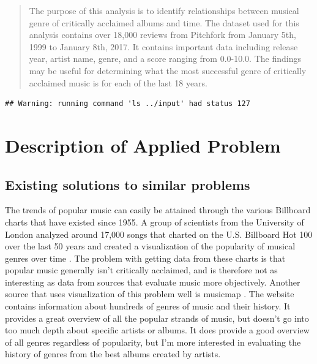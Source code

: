 \documentclass{article}
\begin{document}


\begin{abstract} 
{\bf } The purpose of this analysis is to identify relationships between
musical genre of critically acclaimed albums and time. The dataset used
for this analysis contains over 18,000 reviews from Pitchfork from
January 5th, 1999 to January 8th, 2017. It contains important data
including release year, artist name, genre, and a score ranging from
0.0-10.0. The findings may be useful for determining what the most
successful genre of critically acclaimed music is for each of the last
18 years. \end{abstract} 


\begin{verbatim}
## Warning: running command 'ls ../input' had status 127
\end{verbatim}

\section{Description of Applied
Problem}\label{description-of-applied-problem}

\subsection{Existing solutions to similar
problems}\label{existing-solutions-to-similar-problems}

The trends of popular music can easily be attained through the various
Billboard charts that have existed since 1955. A group of scientists
from the University of London analyzed around 17,000 songs that charted
on the U.S. Billboard Hot 100 over the last 50 years and created a
visualization of the popularity of musical genres over time
\citep{Billboard100}. The problem with getting data from these charts is
that popular music generally isn't critically acclaimed, and is
therefore not as interesting as data from sources that evaluate music
more objectively. Another source that uses visualization of this problem
well is musicmap \citep{musicmap}. The website contains information
about hundreds of genres of music and their history. It provides a great
overview of all the popular strands of music, but doesn't go into too
much depth about specific artists or albums. It does provide a good
overview of all genres regardless of popularity, but I'm more interested
in evaluating the history of genres from the best albums created by
artists.
\end{document}

